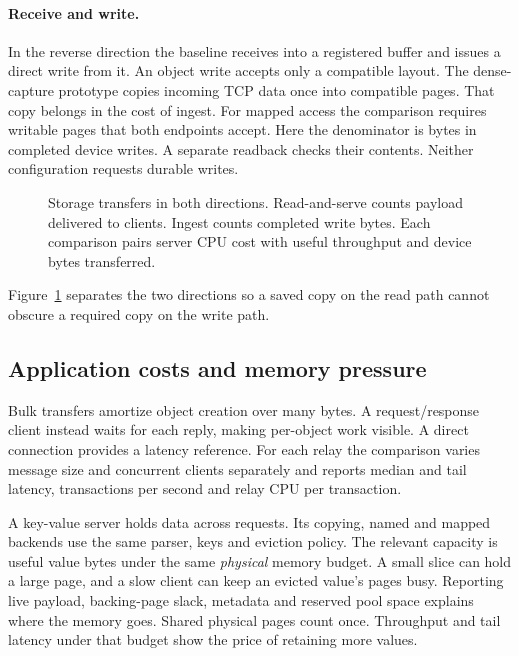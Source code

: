 \paragraph{Receive and write.} In the reverse direction the baseline receives
into a registered buffer and issues a direct write from it. An object write
accepts only a compatible layout. The dense-capture prototype copies incoming
TCP data once into compatible pages. That copy belongs in the cost of ingest.
For mapped access the comparison requires writable pages that both endpoints
accept. Here the denominator is bytes in completed device writes. A separate
readback checks their contents. Neither configuration requests durable writes.

\begin{figure}[t]
\centering
{}
\caption{Storage transfers in both directions. Read-and-serve counts payload
delivered to clients. Ingest counts completed write bytes. Each comparison
pairs server CPU cost with useful throughput and device bytes transferred.}
\label{fig:block}
\end{figure}
Figure~\ref{fig:block} separates the two directions so a saved copy on the read
path cannot obscure a required copy on the write path.

\subsection{Application costs and memory pressure}
\label{sec:eval:rr}
\label{sec:eval:store}
\label{sec:eval:retention}
\label{sec:eval:planned}

Bulk transfers amortize object creation over many bytes. A request/response
client instead waits for each reply, making per-object work visible. A direct
connection provides a latency reference. For each relay the comparison varies
message size and concurrent clients separately and reports median and tail
latency, transactions per second and relay CPU per transaction.

A key-value server holds data across requests. Its copying, named and mapped
backends use the same parser, keys and eviction policy. The relevant capacity is
useful value bytes under the same \emph{physical} memory budget. A small slice
can hold a large page, and a slow client can keep an evicted value's pages busy.
Reporting live payload, backing-page slack, metadata and reserved pool space
explains where the memory goes. Shared physical pages count once. Throughput
and tail latency under that budget show the price of retaining more values.

